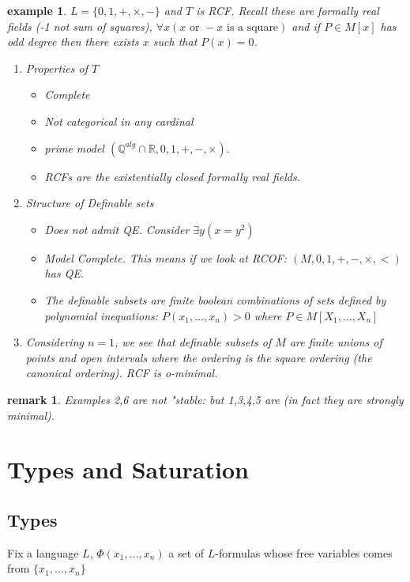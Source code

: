 \documentclass[letterpaper, 12pt]{article}
\newcommand{\fin}{\qquad \quad \hfill \framebox[1.75mm][l]{\,}}
\newcommand{\bR}{\mathbb{R}}
\newcommand{\bQ}{\mathbb{Q}}
\theoremstyle{stdthm}
\theoremstyle{stddef}
\newtheorem{rem}[thm]{remark} %
\newtheorem{eg}[thm]{example} %
\theoremstyle{stdnonum}
\theoremstyle{stdqands}
\theoremstyle{stdbold}
\begin{document}
\begin{eg}
$L = \{0,1,+,\times,-\}$ and $T$ is RCF. Recall these are formally real fields (-1 not sum of squares), $\forall x(x \mbox{ or } -x \mbox{ is a square})$ and if $P \in M[x]$ has odd degree then there exists $x$ such that $P(x) = 0$. 
\begin{enumerate}
\item Properties of $T$
\begin{itemize}
\item Complete
\item Not categorical in any cardinal
\item prime model $(\bQ^{alg} \cap \bR, 0, 1, +, -, \times)$. 
\item RCFs are the existentially closed formally real fields. 
\end{itemize}
\item Structure of Definable sets
\begin{itemize}
\item Does not admit QE. Consider $\exists y(x=y^2)$
\item Model Complete. This means if we look at RCOF: $(M,0,1,+,-,\times, <)$  has QE. 
\item The definable subsets are finite boolean combinations of sets defined by  polynomial inequations: $P(x_1,\dots, x_n) >0$ where $P \in M[X_1,\dots, X_n]$
\end{itemize}
\item Considering $n=1$, we see that definable subsets of $M$ are finite unions of points and open intervals where the ordering is the square ordering (the canonical ordering). RCF is o-minimal. 

\end{enumerate}

\end{eg}

\begin{rem}
Examples 2,6 are not "stable: but 1,3,4,5 are (in fact they are strongly minimal). 
\end{rem}

\section{Types and Saturation}

\subsection{Types}
Fix a language $L$, $\Phi(x_1,\dots,x_n)$ a set of $L$-formulas whose free variables comes from $\{x_1,\dots, x_n\}$
\end{document}

